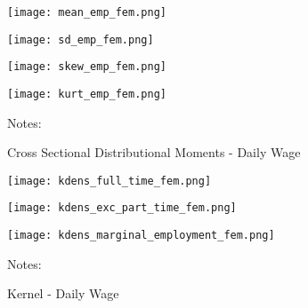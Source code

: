 \documentclass[12pt, a4paper]{article}
\begin{document}

\begin{figure}[!h]
\captionsetup{font=large}
\caption{Cross Sectional Distributional Moments - Daily Wage}
	\begin{minipage}[b]{0.48\textwidth} 
		\centering
		\texttt{[image: mean\_emp\_fem.png]}
		\label{fig:mean_emp_fem}
	\end{minipage}
	\begin{minipage}[b]{0.48\textwidth}
		\centering
		\texttt{[image: sd\_emp\_fem.png]}
		\label{fig:var_emp_fem}
	\end{minipage}
	\begin{minipage}[b]{0.48\textwidth} 
		\centering
		\texttt{[image: skew\_emp\_fem.png]}
		\label{fig:skew_emp_fem}
	\end{minipage}
	\begin{minipage}[b]{0.48\textwidth}
		\centering
		\texttt{[image: kurt\_emp\_fem.png]}
		\label{fig:kurt_emp_fem}
	\end{minipage}
\footnotesize{
\justifying Notes: \par} 
\end{figure}

\begin{figure}[!h]
\captionsetup{font=large}
\caption{Kernel - Daily Wage}
	\begin{minipage}[b]{0.32\textwidth} 
		\centering
		\texttt{[image: kdens\_full\_time\_fem.png]}
		\label{fig:kdens_full_time_fem}
	\end{minipage}
	\begin{minipage}[b]{0.32\textwidth}
		\centering
		\texttt{[image: kdens\_exc\_part\_time\_fem.png]}
		\label{fig:kdens_exc_part_time_fem}
	\end{minipage}
	\begin{minipage}[b]{0.32\textwidth} 
		\centering
		\texttt{[image: kdens\_marginal\_employment\_fem.png]}
		\label{fig:kdens_marginal_employment_fem}
	\end{minipage}
\footnotesize{
\justifying Notes: \par} 
\end{figure}
\end{document}
